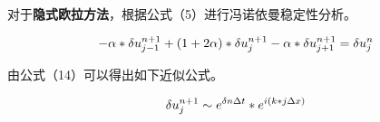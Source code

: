 \documentclass[final]{cvpr}
\begin{document}
对于\textbf{隐式欧拉方法}，根据公式（5）进行冯诺依曼稳定性分析。
\begin{center}
	\begin{scriptsize}
		\begin{equation}
				\setlength{\abovedisplayskip}{-5pt}
				-\alpha * \delta u_{j-1}^{n+1}+(1+2 \alpha) * \delta u_{j}^{n+1}-\alpha * \delta u_{j+1}^{n+1}=\delta u_{j}^{n}
		\end{equation}
	\end{scriptsize}
\end{center}
由公式（14）可以得出如下近似公式。
\begin{center}
	\begin{scriptsize}
		\begin{equation}
				\setlength{\abovedisplayskip}{-5pt}
				\delta u_{j}^{n+1} \sim e^{\delta n \Delta t} * e^{i(k * j \Delta x)}
		\end{equation}
	\end{scriptsize}
\end{center}
\end{document}
